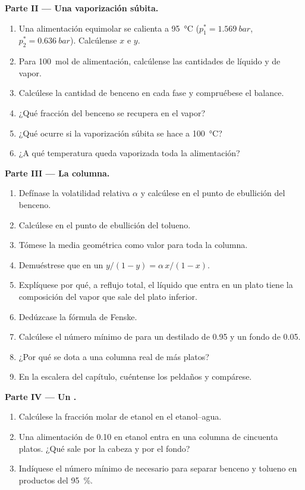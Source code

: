 \begin{problem}
\medskip
\noindent\textbf{Parte II --- Una vaporización súbita.}
\begin{enumerate}[resume]
  \item Una alimentación equimolar se calienta a \qty{95}{\degreeCelsius} ($p_1^* =
        \qty{1.569}{bar}$, $p_2^* = \qty{0.636}{bar}$). Calcúlense $x$ e $y$.
  \item Para \qty{100}{mol} de alimentación, calcúlense las cantidades de líquido y de vapor.
  \item Calcúlese la cantidad de benceno en cada fase y compruébese el balance.
  \item ¿Qué fracción del benceno se recupera en el vapor?
  \item ¿Qué ocurre si la vaporización súbita se hace a \qty{100}{\degreeCelsius}?
  \item ¿A qué temperatura queda vaporizada toda la alimentación?
\end{enumerate}

\medskip
\noindent\textbf{Parte III --- La columna.}
\begin{enumerate}[resume]
  \item Defínase la volatilidad relativa $\alpha$ y calcúlese en el punto de
        ebullición del benceno.
  \item Calcúlese en el punto de ebullición del tolueno.
  \item Tómese la media geométrica como valor para toda la columna.
  \item Demuéstrese que en un  $y/(1 - y) = \alpha\,x/(1 - x)$.
  \item Explíquese por qué, a reflujo total, el líquido que entra en un plato tiene la
        composición del vapor que sale del plato inferior.
  \item Dedúzcase la fórmula de Fenske.
  \item Calcúlese el número mínimo de  para un destilado de
        0.95 y un fondo de 0.05.
  \item ¿Por qué se dota a una columna real de más platos?
  \item En la escalera del capítulo, cuéntense los peldaños y compárese.
\end{enumerate}

\medskip
\noindent\textbf{Parte IV --- Un .}
\begin{enumerate}[resume]
  \item Calcúlese la fracción molar de etanol en el  etanol--agua.
  \item Una alimentación de 0.10 en etanol entra en una columna de cincuenta platos. ¿Qué sale por
        la cabeza y por el fondo?
  \item Indíquese el número mínimo de  necesario para separar
        benceno y tolueno en productos del 95~\%.
\end{enumerate}
\end{problem}

